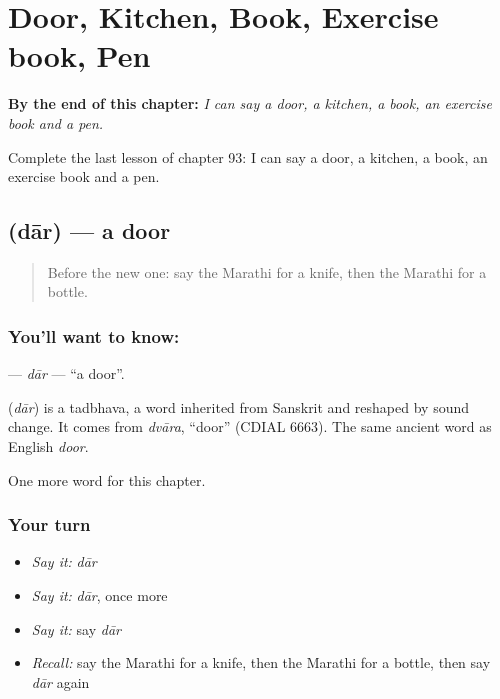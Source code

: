 
\chapter{Door, Kitchen, Book, Exercise book, Pen}
\label{ch:mr-door-kitchen-book-exercise-book-pen}

\begin{chapteropening}
\textbf{By the end of this chapter:} \emph{I can say a door, a kitchen, a book, an exercise book and a pen.}

Complete the last lesson of chapter 93: I can say a door, a kitchen, a book, an exercise book and a pen.
\end{chapteropening}

\section[\texorpdfstring{\mr{दार} (dār)}{दार (dār)}]{ (dār) — a door}

\label{lesson:MR-C93-dar}



\begin{quote}
Before the new one: say the Marathi for a knife, then the Marathi for a bottle.
\end{quote}

\subsection*{You'll want to know: }
\textbf{} — \emph{dār} — \textquotedblleft{}a door\textquotedblright{}.

\begin{cousinweb}
\textbf{} (\emph{dār}) is a tadbhava, a word inherited from Sanskrit and reshaped by sound change. It comes from \emph{dvāra}, \textquotedblleft{}door\textquotedblright{} (CDIAL 6663). The same ancient word as English \emph{door}.
\end{cousinweb}

\begin{grammarlens}[title={What you've built}]
One more word for this chapter.
\end{grammarlens}

\subsection*{Your turn}
\begin{itemize}
\raggedright
  \item \emph{Say it:} \emph{dār}
  \item \emph{Say it:} \emph{dār}, once more
  \item \emph{Say it:} say \emph{dār}
  \item \emph{Recall:} say the Marathi for a knife, then the Marathi for a bottle, then say \emph{dār} again
\end{itemize}

